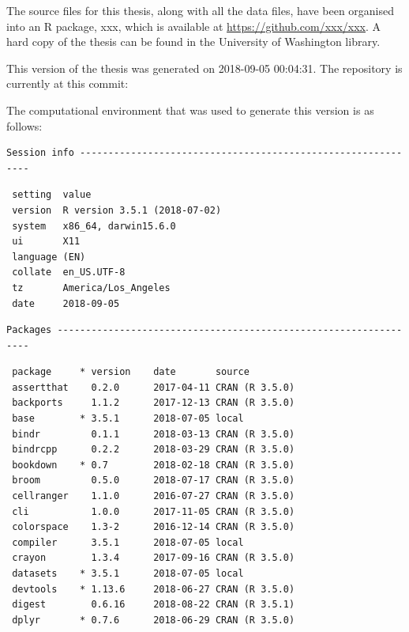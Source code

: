 \documentclass[twoside,12pt,final]{ucthesis-CA2012}
\begin{document}
\begin{ucmainmatter}
The source files for this thesis, along with all the data files, have
been organised into an R package, xxx, which is available at
\url{https://github.com/xxx/xxx}. A hard copy of the thesis can be found
in the University of Washington library.

This version of the thesis was generated on 2018-09-05 00:04:31. The
repository is currently at this commit:

The computational environment that was used to generate this version is
as follows:
\begin{verbatim}
Session info -------------------------------------------------------------
\end{verbatim}
\begin{verbatim}
 setting  value                       
 version  R version 3.5.1 (2018-07-02)
 system   x86_64, darwin15.6.0        
 ui       X11                         
 language (EN)                        
 collate  en_US.UTF-8                 
 tz       America/Los_Angeles         
 date     2018-09-05                  
\end{verbatim}
\begin{verbatim}
Packages -----------------------------------------------------------------
\end{verbatim}
\begin{verbatim}
 package     * version    date       source                               
 assertthat    0.2.0      2017-04-11 CRAN (R 3.5.0)                       
 backports     1.1.2      2017-12-13 CRAN (R 3.5.0)                       
 base        * 3.5.1      2018-07-05 local                                
 bindr         0.1.1      2018-03-13 CRAN (R 3.5.0)                       
 bindrcpp      0.2.2      2018-03-29 CRAN (R 3.5.0)                       
 bookdown    * 0.7        2018-02-18 CRAN (R 3.5.0)                       
 broom         0.5.0      2018-07-17 CRAN (R 3.5.0)                       
 cellranger    1.1.0      2016-07-27 CRAN (R 3.5.0)                       
 cli           1.0.0      2017-11-05 CRAN (R 3.5.0)                       
 colorspace    1.3-2      2016-12-14 CRAN (R 3.5.0)                       
 compiler      3.5.1      2018-07-05 local                                
 crayon        1.3.4      2017-09-16 CRAN (R 3.5.0)                       
 datasets    * 3.5.1      2018-07-05 local                                
 devtools    * 1.13.6     2018-06-27 CRAN (R 3.5.0)                       
 digest        0.6.16     2018-08-22 CRAN (R 3.5.1)                       
 dplyr       * 0.7.6      2018-06-29 CRAN (R 3.5.0)                       

\end{verbatim}
\end{ucmainmatter}
\end{document}
